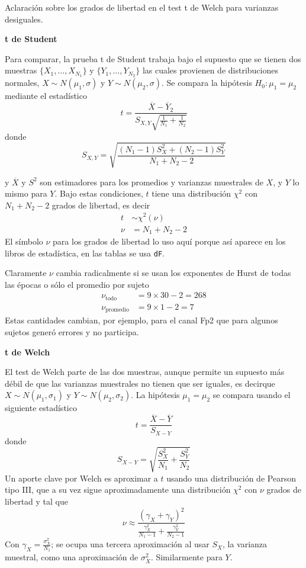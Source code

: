 \documentclass[10pt,a4paper]{article}
\begin{document}
Aclaración sobre los grados de libertad en el test t de Welch para varianzas desiguales.

\textbf{t de Student}

Para comparar, la prueba t de Student trabaja bajo el supuesto que se tienen dos muestras
$\{ X_1, \dots , X_{N_1} \}$ y $\{ Y_1, \dots , Y_{N_2} \}$ las cuales 
provienen de 
distribuciones normales, $X \sim N(\mu_1,\sigma)$ y $Y \sim N(\mu_2,\sigma)$.
Se compara la hipótesis 
$
H_0 : \mu_1 = \mu_2
$
mediante el estadístico 
$$ t = \frac{\overline{X}-\overline{Y}_2}{S_{X,Y}\sqrt{\frac{1}{N_1}+\frac{1}{N_2}}} $$
donde
$$ S_{X,Y} = \sqrt{\frac{(N_1-1)S_X^2+(N_2-1)S_Y^2}{N_1+N_2-2}} $$

y $\overline{X}$ y $S^2$ son estimadores para los promedios y varianzas muestrales de
$X$, y $Y$ lo mismo para $Y$.
Bajo estas condiciones, $t$ tiene una distribución $\chi^2$ con $N_1+N_2-2$ grados de libertad, es
decir 
\begin{align*}
t &\sim \chi^2(\nu) \\
 \nu &= N_1+N_2-2
\end{align*}
El símbolo $\nu$ para los grados de libertad lo uso aquí porque así aparece en los libros de 
estadística, en las tablas se usa \texttt{dF}.

Claramente $\nu$ cambia radicalmente si se usan los exponentes de Hurst de todas las épocas o
sólo el promedio por sujeto
\begin{align*}
\nu_{\text{todo}} &= 9\times 30 -2 = 268 \\
\nu_{\text{promedio}} &= 9\times 1 -2 = 7
\end{align*}
Estas cantidades cambian, por ejemplo, para el canal Fp2 que para algunos sujetos generó errores
y no participa.

\textbf{t de Welch}

El test de Welch parte de las dos muestras, aunque permite un supuesto más débil de que las
varianzas muestrales no tienen que ser iguales, es decirque $X \sim N(\mu_1,\sigma_1)$ y 
$Y \sim N(\mu_2,\sigma_2)$. La hipótesis $\mu_1=\mu_2$ se compara usando el siguiente estadístico
$$
t = \frac{\overline{X}-\overline{Y}}{S_{X-Y}}
$$
donde
$$
S_{X-Y} = \sqrt{\frac{S_X^2}{N_1}+\frac{S_Y^2}{N_2}}
$$
Un aporte clave por Welch es aproximar a $t$ usando una distribución de Pearson tipo III, que a su
vez sigue aproximadamente una distribución $\chi^2$ con $\nu$ grados de libertad y tal que
$$
\nu \approx \frac{(\gamma_X+\gamma_Y)^2}{\frac{\gamma_X^2}{N_1-1}+\frac{\gamma_Y^2}{N_2-1}}
$$
Con $\gamma_X = \frac{\sigma_X^2}{N_1}$; se ocupa una tercera aproximación 
al usar $S_X$, la varianza muestral, como una aproximación de $\sigma_X^2$. Similarmente para $Y$.
\end{document}
